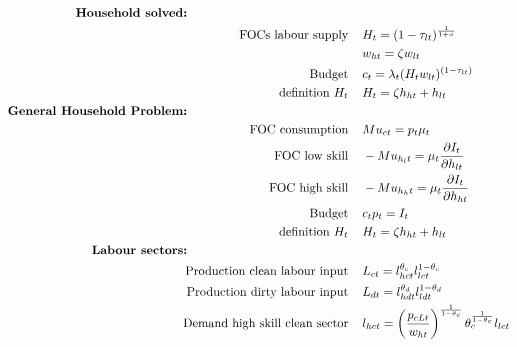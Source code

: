 \begin{align*}
\text{\textbf{Household solved:}} \hspace{50mm}& \\
\text{FOCs labour supply}\hspace{4mm}&  %
H_t=(1-\tau_{lt})^\frac{1}{1+\sigma}\\
\ \hspace{4mm} & %
w_{ht}=\zeta w_{lt}\\
\text{Budget}\hspace{4mm}&  %
c_t= \lambda_t (H_tw_{lt})^{(1-\tau_{lt})}\\
\text{definition}\  H_t\hspace{4mm} & %
H_t=\zeta h_{ht}+h_{lt}
\\
\text{\textbf{General Household Problem:}} \hspace{50mm}& \\
\text{FOC consumption}\hspace{4mm}& Mu_{ct}=p_t\mu_t\\
\text{FOC low skill}\hspace{4mm} & -Mu_{h_lt}=\mu_t \frac{\partial I_t}{\partial h_{lt}}\\
\text{FOC high skill}\hspace{4mm} & -Mu_{h_ht}=\mu_t \frac{\partial I_t}{\partial h_{ht}}\\
\text{Budget}\hspace{4mm}& c_tp_t= I_t\\
\text{definition}\  H_t\hspace{4mm} & H_t=\zeta h_{ht}+h_{lt}\\
\text{\textbf{Labour sectors:}}\hspace{50mm}&\\
\text{Production clean labour input} \hspace{4mm}& L_{ct}=l_{hct}^{\theta_c}l_{lct}^{1-\theta_c}\\ 
\text{Production dirty labour input} \hspace{4mm}& L_{dt}=l_{hdt}^{\theta_d}l_{ldt}^{1-\theta_d}\\
%
\text{Demand high skill clean sector}\hspace{4mm}&l_{hct}= \left(\frac{p_{cLt}}{w_{ht}}\right)^{\frac{1}{1-\theta_c}}\theta_c^{\frac{1}{1-\theta_c}}l_{lct}\\

\end{align*}
